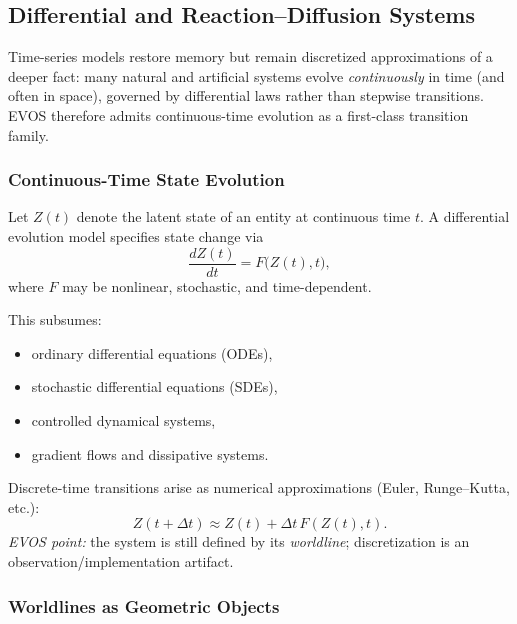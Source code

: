 \documentclass[11pt]{article}
\begin{document}


\vspace{3mm}

\subsection{Differential and Reaction--Diffusion Systems}
\label{sec:diffusion}

Time-series models restore memory but remain discretized approximations of a deeper fact:
many natural and artificial systems evolve \emph{continuously} in time (and often in space),
governed by differential laws rather than stepwise transitions. EVOS therefore admits
continuous-time evolution as a first-class transition family.

\subsubsection{Continuous-Time State Evolution}

Let $Z(t)$ denote the latent state of an entity at continuous time $t$. A differential
evolution model specifies state change via
\[
\frac{dZ(t)}{dt} = F\!\big(Z(t), t\big),
\]
where $F$ may be nonlinear, stochastic, and time-dependent.

This subsumes:
\begin{itemize}
  \item ordinary differential equations (ODEs),
  \item stochastic differential equations (SDEs),
  \item controlled dynamical systems,
  \item gradient flows and dissipative systems.
\end{itemize}

Discrete-time transitions arise as numerical approximations (Euler, Runge--Kutta, etc.):
\[
Z(t+\Delta t) \approx Z(t) + \Delta t \, F(Z(t),t).
\]
\emph{EVOS point:} the system is still defined by its \emph{worldline}; discretization is an
observation/implementation artifact.

\subsubsection{Worldlines as Geometric Objects}
\end{document}
